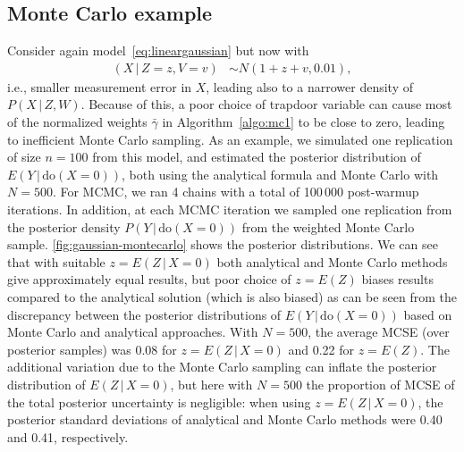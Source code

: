 \documentclass{statsoc}
\newcommand{\+}[1]{\ensuremath{\mathbf{#1}}}
\newcommand{\doo}{\textrm{do}}
\newcommand{\given}{{ \, | \, }}
\begin{document}
\subsection{Monte Carlo example}
\label{sec:monte-carlo-example}

Consider again model~\eqref{eq:lineargaussian} but now with
\begin{equation*}
\begin{aligned}
(X \given Z = z, V = v) &\sim N(1 + z + v, 0.01),
\end{aligned}
\end{equation*}
i.e., smaller measurement error in $X$, leading also to a narrower density of $P(X \given Z, W)$. Because of this, a poor choice of trapdoor variable can cause most of the normalized weights $\bar \gamma$ in Algorithm~\ref{algo:mc1} to be close to zero, leading to inefficient Monte Carlo sampling. As an example, we simulated one replication of size $n=100$ from this model, and estimated the posterior distribution of $E(Y \given \doo(X = 0))$, both using the analytical formula and Monte Carlo with $N = 500$. For MCMC, we ran 4 chains with a total of 100\,000 post-warmup iterations. In addition, at each MCMC iteration we sampled one replication from the posterior density $P(Y \given  \doo(X = 0))$ from the weighted Monte Carlo sample. \autoref{fig:gaussian-montecarlo} shows the posterior distributions. We can see that with suitable $z = E(Z \given  X = 0)$ both analytical and Monte Carlo methods give approximately equal results, but poor choice of $z=E(Z)$ biases results compared to the analytical solution (which is also biased) as can be seen from the discrepancy between the posterior distributions of $E(Y \given \doo(X = 0))$ based on Monte Carlo and analytical approaches. With $N = 500$, the average MCSE (over posterior samples) was 0.08 for $z = E(Z \given  X = 0)$ and 0.22 for $z=E(Z)$. The additional variation due to the Monte Carlo sampling can inflate the posterior distribution of $E(Z \given  X = 0)$, but here with $N = 500$ the proportion of MCSE of the total posterior uncertainty is negligible: when using $z = E(Z \given  X = 0)$, the posterior standard deviations of analytical and Monte Carlo methods were 0.40 and 0.41, respectively.
\end{document}
